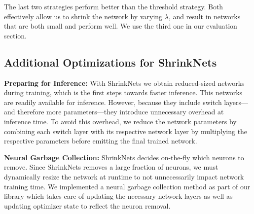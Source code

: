 The last two strategies perform better than the threshold strategy.  Both
effectively allow us to shrink the network by varying $\lambda$, and result in
networks that are both small and perform well. We use the third one in our
evaluation section. 

\subsection{Additional Optimizations for ShrinkNets}

\noindent\textbf{Preparing for Inference: } With ShrinkNets we obtain
reduced-sized networks during training, which is the first steps towards faster
inference. This networks are readily available for inference. However, because
they include switch layers---and therefore more parameters---they introduce
unnecessary overhead at inference time. To avoid this overhead, we reduce the
network parameters by combining each switch layer with its respective network
layer by multiplying the respective parameters before emitting the final trained
network. 

\noindent\textbf{Neural Garbage Collection: }ShrinkNets decides on-the-fly which
neurons to remove. Since ShrinkNets removes a large fraction of neurons, we must
dynamically resize the network at runtime to not unnecessarily impact network
training time. We implemented a neural garbage collection method as part of our
library which takes care of updating the necessary network layers as well as
updating optimizer state to reflect the neuron removal.


